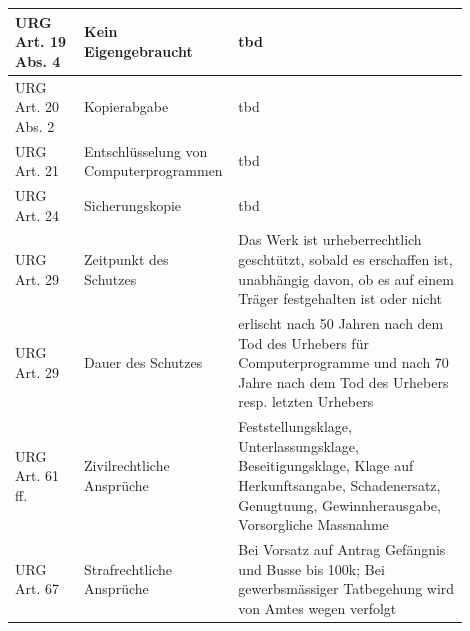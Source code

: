 \documentclass{report}
\theoremstyle{definition}
\theoremstyle{example}
\begin{document}
\begin{tabular}[h]{p{0.15\linewidth}|p{0.25\linewidth}|p{0.50\linewidth}}
   \hline
   URG Art. 19 Abs. 4 & Kein Eigengebraucht & tbd \\
   \hline
   URG Art. 20 Abs. 2 & Kopierabgabe & tbd\\
   \hline
   URG Art. 21 & Entschlüsselung von Computerprogrammen & tbd \\
   \hline
   URG Art. 24 & Sicherungskopie & tbd \\
   \hline
   URG Art. 29 & Zeitpunkt des Schutzes & Das Werk ist urheberrechtlich geschtützt, sobald es erschaffen ist, unabhängig davon, ob es auf einem Träger festgehalten ist oder nicht \\
   \hline
   URG Art. 29 & Dauer des Schutzes & erlischt nach 50 Jahren nach dem Tod des Urhebers für Computerprogramme und nach 70 Jahre nach dem Tod des Urhebers resp. letzten Urhebers \\
   \hline
   URG Art. 61 ff. & Zivilrechtliche Ansprüche & Feststellungsklage, Unterlassungsklage, Beseitigungsklage, Klage auf Herkunftsangabe, Schadenersatz, Genugtuung, Gewinnherausgabe, Vorsorgliche Massnahme \\
   \hline
   URG Art. 67 & Strafrechtliche Ansprüche & Bei Vorsatz auf Antrag Gefängnis und Busse bis 100k; Bei gewerbsmässiger Tatbegehung wird von Amtes wegen verfolgt \\
\end{tabular}
\end{document}
